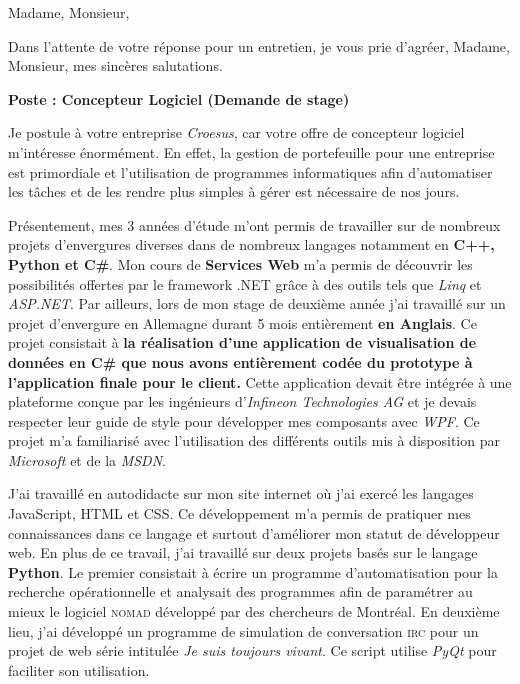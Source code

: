 \date{\today}
\opening{Madame, Monsieur,}
\closing{Dans l'attente de votre réponse pour un entretien, je vous prie d'agréer, Madame, Monsieur, mes sincères salutations.}

\makelettertitle

\textbf{Poste : Concepteur Logiciel (Demande de stage)}

\introduction{}
Je postule à votre entreprise \textit{Croesus}, car votre offre de concepteur logiciel m'intéresse énormément. En effet, la gestion de portefeuille pour une entreprise est primordiale et l'utilisation de programmes informatiques afin d'automatiser les tâches et de les rendre plus simples à gérer est nécessaire de nos jours.

Présentement, mes 3 années d'étude m'ont permis de travailler sur de nombreux projets d'envergures diverses dans de nombreux langages notamment en \textbf{C++, Python et C\#}. Mon cours de \textbf{Services Web} m'a permis de découvrir les possibilités offertes par le framework .NET grâce à des outils tels que \textit{Linq} et \textit{ASP.NET}. Par ailleurs, lors de mon stage de deuxième année j'ai travaillé sur un projet d'envergure en Allemagne durant 5 mois entièrement \textbf{en Anglais}. Ce projet consistait à \textbf{la réalisation d'une application de visualisation de données en C\# que nous avons entièrement codée du prototype à l'application finale pour le client.} Cette application devait être intégrée à une plateforme conçue par les ingénieurs d'\textit{Infineon Technologies AG} et je devais respecter leur guide de style pour développer mes composants avec \textit{WPF}. Ce projet m'a familiarisé avec l'utilisation des différents outils mis à disposition par \textit{Microsoft} et de la \textit{MSDN}.

J'ai travaillé en autodidacte sur mon site internet où j'ai exercé les langages JavaScript, HTML et CSS. Ce développement m'a permis de pratiquer mes connaissances dans ce langage et surtout d'améliorer mon statut de développeur web. En plus de ce travail, j'ai travaillé sur deux projets basés sur le langage \textbf{Python}. Le premier consistait à écrire un programme d'automatisation pour la recherche opérationnelle et analysait des programmes afin de paramétrer au mieux le logiciel \textsc{nomad} développé par des chercheurs de Montréal. En deuxième lieu, j'ai développé un programme de simulation de conversation \textsc{irc} pour un projet de web série intitulée \textit{Je suis toujours vivant}. Ce script utilise \textit{PyQt} pour faciliter son utilisation.

